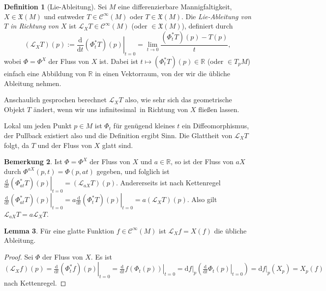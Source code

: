 \documentclass[a4paper]{scrbook}
\numberwithin{equation}{chapter}
\newcommand{\D}{\mathrm{d}}
\newcommand{\R}{\mathbb{R}}
\newcommand{\sC}{\mathcal{C}^{\infty}}
\theoremstyle{definition}
\newtheorem{defn}{Definition}[section]
\newtheorem{lemma}[defn]{Lemma}
\newtheorem{bem}[defn]{Bemerkung}
\begin{document}
\begin{defn}[Lie-Ableitung]
	Sei $M$ eine differenzierbare Mannigfaltigkeit, $X \in \mathfrak X(M)$ und entweder $T \in \sC(M)$ oder $T \in \mathfrak X(M)$. Die \emph{Lie-Ableitung von $T$ in Richtung von $X$} ist $\mathcal L_X T \in \sC(M)$ (oder $\in \mathfrak X(M)$), definiert durch
	\[(\mathcal L_X T)(p) := \left.\frac{\D}{\D t}(\Phi_t^* T)(p)\right|_{t=0} = \lim_{t\to 0} \frac{(\Phi_t^* T)(p) - T(p)}{t},\]
	wobei $\Phi = \Phi^X$ der Fluss von $X$ ist. Dabei ist $t \mapsto (\Phi_t^*T)(p) \in \mathbb R$ (oder $\in T_pM$) einfach eine Abbildung von $\mathbb R$ in einen Vektorraum, von der wir die übliche Ableitung nehmen.

	Anschaulich gesprochen  berechnet $\mathcal L_X T$ also, wie sehr sich das geometrische Objekt $T$ ändert, wenn wir uns \glqq infinitesimal\grqq\ in Richtung von $X$ fließen lassen.
	
	Lokal um jeden Punkt $p\in M$ ist $\Phi_t$ für genügend kleines $t$ ein Diffeomorphismus, der Pullback existiert also und die Definition ergibt Sinn. Die Glattheit von $\mathcal L_X T$ folgt, da $T$ und der Fluss von $X$ glatt sind.
\end{defn}

\begin{bem}
	Ist $\Phi = \Phi^X$ der Fluss von $X$ und $a\in\R$, so ist der Fluss von $aX$ durch $\Phi^{aX}(p,t) = \Phi(p,at)$ gegeben, und folglich ist $\left.\frac{\D}{\D t} (\Phi_{at}^* T)(p) \right|_{t=0} = (\mathcal L_{aX} T)(p)$. Andererseits ist nach Kettenregel $\left.\frac{\D}{\D t} (\Phi_{at}^* T)(p) \right|_{t=0} = a \left.\frac{\D}{\D t} (\Phi_t^* T)(p) \right|_{t=0} = a (\mathcal L_X T)(p)$. Also gilt $\mathcal L_{aX} T = a \mathcal L_X T$.
\end{bem}

\begin{lemma} \label{lemma:lie_abl_funk}
	Für eine glatte Funktion $f \in \sC(M)$ ist $\mathcal L_X f = X(f)$ die übliche Ableitung.

	\begin{proof}
		Sei $\Phi$ der Fluss von $X$. Es ist $(\mathcal L_X f)(p) = \left.\frac{\D}{\D t}(\Phi_t^* f)(p)\right|_{t=0}  = \left.\frac{\D}{\D t}f(\Phi_t(p))\right|_{t=0} = \left.\D f\right|_p \left( \left.\frac{\D}{\D t}\Phi_t(p)\right|_{t=0} \right) = \left.\D f\right|_p (X_p) = X_p(f)$ nach Kettenregel.
	\end{proof}
\end{lemma}
\end{document}
